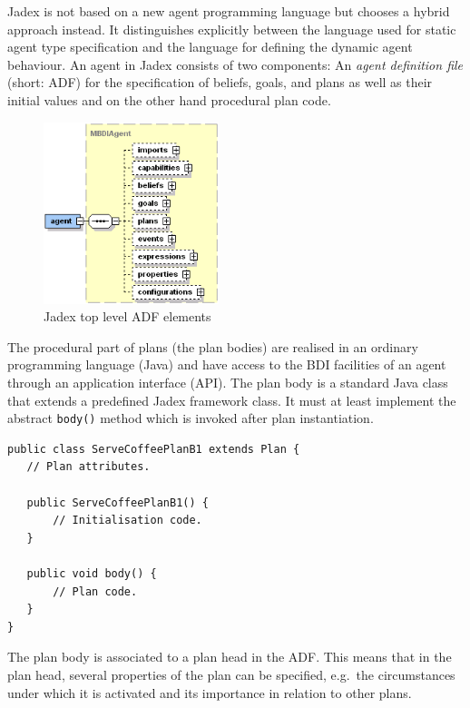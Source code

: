 Jadex is not based on a new agent programming language but chooses a hybrid approach instead.
It distinguishes explicitly between the language used for static agent type specification and the language for defining the dynamic agent behaviour.
An agent in Jadex consists of two components: An \emph{agent definition file} (short: ADF) for the specification of beliefs, goals, and plans as well as their initial values and on the other hand procedural plan code.
\begin{figure}
	\centering
	\includegraphics[height=200px]{images/jadexagentadf.png}
  \caption{Jadex top level ADF elements \cite{ActiveComponents}}
	\label{fig3}
\end{figure}
The procedural part of plans (the plan bodies) are realised in an ordinary programming language (Java) and have access to the BDI facilities of an agent through an application interface (API).
The plan body is a standard Java class that extends a predefined Jadex framework class.
It must at least implement the abstract \texttt{body()} method which is invoked after plan instantiation.
\begin{lstlisting}
public class ServeCoffeePlanB1 extends Plan {
   // Plan attributes.

   public ServeCoffeePlanB1() {
       // Initialisation code.
   }

   public void body() {
       // Plan code.
   }
}
\end{lstlisting}
The plan body is associated to a plan head in the ADF.
This means that in the plan head, several properties of the plan can be specified, e.g.\ the circumstances under which it is activated and its importance in relation to other plans.
